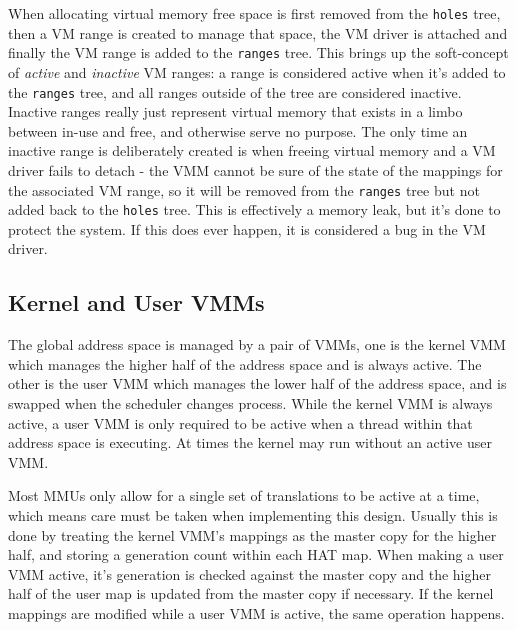When allocating virtual memory free space is first removed from the \lstinline{holes} tree, then a VM range is created to manage that space, the VM driver is attached and finally the VM range is added to the \lstinline{ranges} tree. This brings up the soft-concept of \textit{active} and \textit{inactive} VM ranges: a range is considered active when it's added to the \lstinline{ranges} tree, and all ranges outside of the tree are considered inactive. Inactive ranges really just represent virtual memory that exists in a limbo between in-use and free, and otherwise serve no purpose. The only time an inactive range is deliberately created is when freeing virtual memory and a VM driver fails to detach - the VMM cannot be sure of the state of the mappings for the associated VM range, so it will be removed from the \lstinline{ranges} tree but not added back to the \lstinline{holes} tree. This is effectively a memory leak, but it's done to protect the system. If this does ever happen, it is considered a bug in the VM driver.

\subsection{Kernel and User VMMs}
The global address space is managed by a pair of VMMs, one is the kernel VMM which manages the higher half of the address space and is always active. The other is the user VMM which manages the lower half of the address space, and is swapped when the scheduler changes process. While the kernel VMM is always active, a user VMM is only required to be active when a thread within that address space is executing. At times the kernel may run without an active user VMM.

Most MMUs only allow for a single set of translations to be active at a time, which means care must be taken when implementing this design. Usually this is done by treating the kernel VMM's mappings as the master copy for the higher half, and storing a generation count within each HAT map. When making a user VMM active, it's generation is checked against the master copy and the higher half of the user map is updated from the master copy if necessary. If the kernel mappings are modified while a user VMM is active, the same operation happens.

